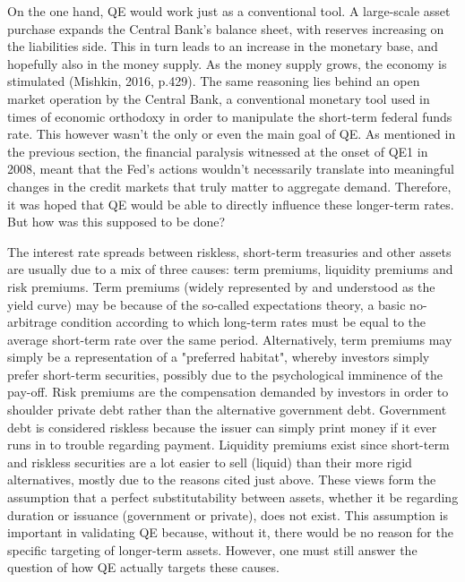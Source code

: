 \documentclass[11pt,a4paper,oneside]{book}
\begin{document}
On the one hand, QE would work just as a conventional tool. A large-scale asset purchase expands the Central Bank's balance sheet, with reserves increasing on the liabilities side. This in turn leads to an increase in the monetary base, and hopefully also in the money supply. As the money supply grows, the economy is stimulated (Mishkin, 2016, p.429). The same reasoning lies behind an open market operation by the Central Bank, a conventional monetary tool used in times of economic orthodoxy in order to manipulate the short-term federal funds rate. This however wasn't the only or even the main goal of QE. As mentioned in the previous section, the financial paralysis witnessed at the onset of QE1 in 2008, meant that the Fed's actions wouldn't necessarily translate into meaningful changes in the credit markets that truly matter to aggregate demand. Therefore, it was hoped that QE would be able to directly influence these longer-term rates. But how was this supposed to be done?

The interest rate spreads between riskless, short-term treasuries and other assets are usually due to a mix of three causes: term premiums, liquidity premiums and risk premiums. Term premiums (widely represented by and understood as the yield curve) may be because of the so-called expectations theory, a basic no-arbitrage condition according to which long-term rates must be equal to the average short-term rate over the same period. Alternatively, term premiums may simply be a representation of a "preferred habitat", whereby investors simply prefer short-term securities, possibly due to the psychological imminence of the pay-off. Risk premiums are the compensation demanded by investors in order to shoulder private debt rather than the alternative government debt. Government debt is considered riskless because the issuer can simply print money if it ever runs in to trouble regarding payment. Liquidity premiums exist since short-term and riskless securities are a lot easier to sell (liquid) than their more rigid alternatives, mostly due to the reasons cited just above. These views form the assumption that a perfect substitutability between assets, whether it be regarding duration or issuance (government or private), does not exist. This assumption is important in validating QE because, without it, there would be no reason for the specific targeting of longer-term assets. However, one must still answer the question of how QE actually targets these causes.
\end{document}
